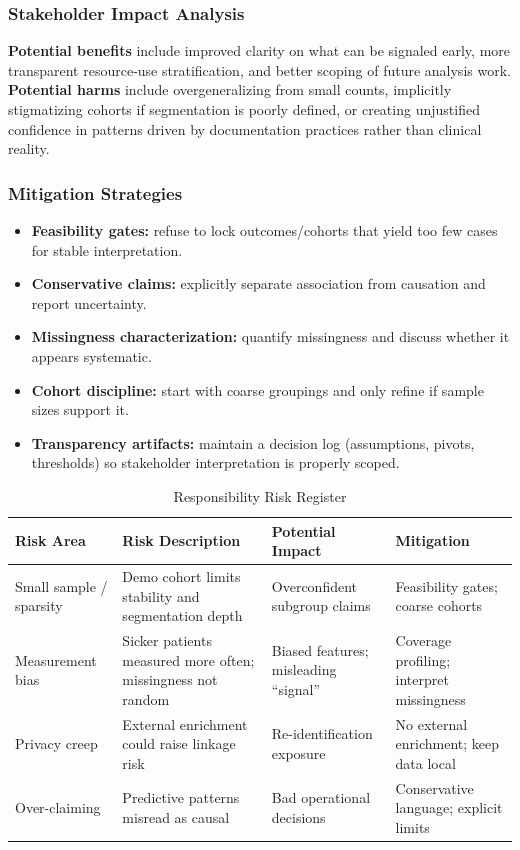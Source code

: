 \documentclass[12pt]{article}
\begin{document}
\subsubsection*{Stakeholder Impact Analysis}
\textbf{Potential benefits} include improved clarity on what can be signaled early, more transparent resource-use stratification, and better scoping of future analysis work. \textbf{Potential harms} include overgeneralizing from small counts, implicitly stigmatizing cohorts if segmentation is poorly defined, or creating unjustified confidence in patterns driven by documentation practices rather than clinical reality.

\subsubsection*{Mitigation Strategies}
\begin{itemize}[leftmargin=1.5em]
    \item \textbf{Feasibility gates:} refuse to lock outcomes/cohorts that yield too few cases for stable interpretation.
    \item \textbf{Conservative claims:} explicitly separate association from causation and report uncertainty.
    \item \textbf{Missingness characterization:} quantify missingness and discuss whether it appears systematic.
    \item \textbf{Cohort discipline:} start with coarse groupings and only refine if sample sizes support it.
    \item \textbf{Transparency artifacts:} maintain a decision log (assumptions, pivots, thresholds) so stakeholder interpretation is properly scoped.
\end{itemize}

\begin{table}[H]
\centering
\caption{Responsibility Risk Register}
\label{tab:risk_register}
\begin{tabular}{p{3.0cm} p{4.7cm} p{3.0cm} p{3.3cm}}
\toprule
\textbf{Risk Area} & \textbf{Risk Description} & \textbf{Potential Impact} & \textbf{Mitigation} \\
\midrule
Small sample / sparsity & Demo cohort limits stability and segmentation depth & Overconfident subgroup claims & Feasibility gates; coarse cohorts \\
Measurement bias & Sicker patients measured more often; missingness not random & Biased features; misleading ``signal'' & Coverage profiling; interpret missingness \\
Privacy creep & External enrichment could raise linkage risk & Re-identification exposure & No external enrichment; keep data local \\
Over-claiming & Predictive patterns misread as causal & Bad operational decisions & Conservative language; explicit limits \\
\bottomrule
\end{tabular}
\end{table}
\end{document}
